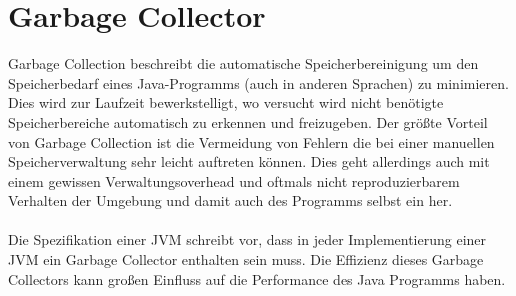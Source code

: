 \documentclass[a4paper,14pt]{scrreprt}
\begin{document}
\section{Garbage Collector}
Garbage Collection beschreibt die automatische Speicherbereinigung um den Speicherbedarf eines Java-Programms (auch in anderen Sprachen) zu minimieren. Dies wird zur Laufzeit bewerkstelligt, wo versucht wird nicht benötigte Speicherbereiche automatisch zu erkennen und freizugeben. Der größte Vorteil von Garbage Collection ist die Vermeidung von Fehlern die bei einer manuellen Speicherverwaltung sehr leicht auftreten können. Dies geht allerdings auch mit einem gewissen Verwaltungsoverhead und oftmals nicht reproduzierbarem Verhalten der Umgebung und damit auch des Programms selbst ein her.\\\\Die Spezifikation einer JVM schreibt vor, dass in jeder Implementierung einer JVM ein Garbage Collector enthalten sein muss. Die Effizienz dieses Garbage Collectors kann großen Einfluss auf die Performance des Java Programms haben.
\end{document}
